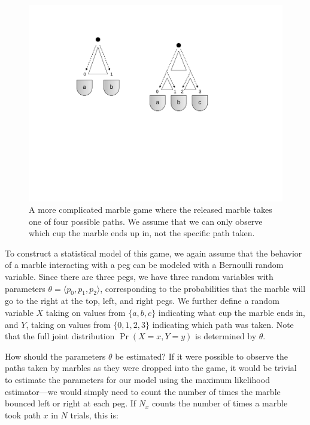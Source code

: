 \begin{figure}[t]
\begin{center}
\vspace{0.2cm}
\includegraphics[scale=0.6]{figures/fig-ch6-em-marble2.pdf}
\vspace{-0.3cm}
\end{center}\caption{A more complicated marble game where the released marble takes one of four possible paths.  We assume that we can only observe which cup the marble ends up in, not the specific path taken.}\label{chapter6_figure_plinko2}
\end{figure}

To construct a statistical model of this game, we again assume that
the behavior of a marble interacting with a peg can be modeled with a
Bernoulli random variable.  Since there are three pegs, we have three
random variables with parameters $\theta=\langle p_0, p_1, p_2
\rangle$, corresponding to the probabilities that the marble will go
to the right at the top, left, and right pegs.  We further define a
random variable $X$ taking on values from $\{a,b,c\}$ indicating what
cup the marble ends in, and $Y$, taking on values from $\{0,1,2,3\}$
indicating which path was taken.  Note that the full joint
distribution $\Pr(X=x,Y=y)$ is determined by $\theta$.

How should the parameters $\theta$ be estimated?  If it were possible
to observe the paths taken by marbles as they were dropped into the
game, it would be trivial to estimate the parameters for our model
using the maximum likelihood estimator---we would simply need to count
the number of times the marble bounced left or right at each peg.  If
$N_x$ counts the number of times a marble took path $x$ in $N$ trials,
this is:

